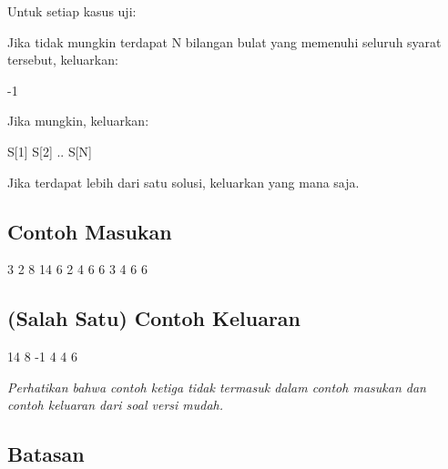 \documentclass[../main_problemset.tex]{subfiles} %
\begin{document}
Untuk setiap kasus uji:

Jika tidak mungkin terdapat N bilangan bulat yang memenuhi seluruh syarat tersebut, keluarkan:

\begin{lcverbatim}
-1
\end{lcverbatim}

Jika mungkin, keluarkan:

\begin{lcverbatim}
S[1] S[2] .. S[N]
\end{lcverbatim}

Jika terdapat lebih dari satu solusi, keluarkan yang mana saja.

\vspace{.4cm}

\begin{minipage}[t]{0.5\textwidth}
\subsection*{Contoh Masukan}

\begin{lcverbatim}
3
2 8 14 6
2 4 6 6
3 4 6 6
\end{lcverbatim}
\end{minipage}
\begin{minipage}[t]{0.5\textwidth}
\subsection*{(Salah Satu) Contoh Keluaran}

\begin{lcverbatim}
14 8
-1
4 4 6
\end{lcverbatim}
\end{minipage}

\textit{Perhatikan bahwa contoh ketiga tidak termasuk dalam contoh masukan dan contoh keluaran dari soal versi mudah.}



\subsection*{Batasan}
\end{document}
